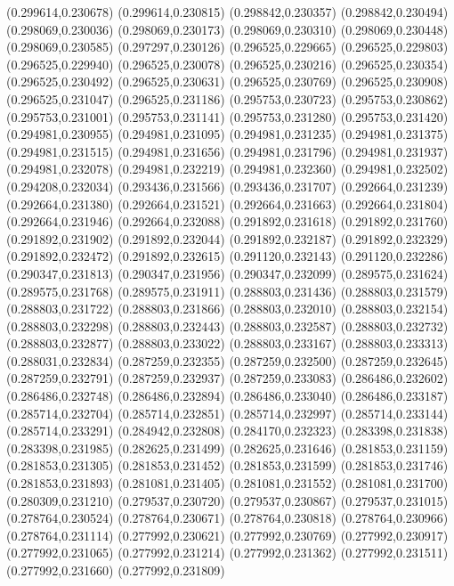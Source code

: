 (0.299614,0.230678)
(0.299614,0.230815)
(0.298842,0.230357)
(0.298842,0.230494)
(0.298069,0.230036)
(0.298069,0.230173)
(0.298069,0.230310)
(0.298069,0.230448)
(0.298069,0.230585)
(0.297297,0.230126)
(0.296525,0.229665)
(0.296525,0.229803)
(0.296525,0.229940)
(0.296525,0.230078)
(0.296525,0.230216)
(0.296525,0.230354)
(0.296525,0.230492)
(0.296525,0.230631)
(0.296525,0.230769)
(0.296525,0.230908)
(0.296525,0.231047)
(0.296525,0.231186)
(0.295753,0.230723)
(0.295753,0.230862)
(0.295753,0.231001)
(0.295753,0.231141)
(0.295753,0.231280)
(0.295753,0.231420)
(0.294981,0.230955)
(0.294981,0.231095)
(0.294981,0.231235)
(0.294981,0.231375)
(0.294981,0.231515)
(0.294981,0.231656)
(0.294981,0.231796)
(0.294981,0.231937)
(0.294981,0.232078)
(0.294981,0.232219)
(0.294981,0.232360)
(0.294981,0.232502)
(0.294208,0.232034)
(0.293436,0.231566)
(0.293436,0.231707)
(0.292664,0.231239)
(0.292664,0.231380)
(0.292664,0.231521)
(0.292664,0.231663)
(0.292664,0.231804)
(0.292664,0.231946)
(0.292664,0.232088)
(0.291892,0.231618)
(0.291892,0.231760)
(0.291892,0.231902)
(0.291892,0.232044)
(0.291892,0.232187)
(0.291892,0.232329)
(0.291892,0.232472)
(0.291892,0.232615)
(0.291120,0.232143)
(0.291120,0.232286)
(0.290347,0.231813)
(0.290347,0.231956)
(0.290347,0.232099)
(0.289575,0.231624)
(0.289575,0.231768)
(0.289575,0.231911)
(0.288803,0.231436)
(0.288803,0.231579)
(0.288803,0.231722)
(0.288803,0.231866)
(0.288803,0.232010)
(0.288803,0.232154)
(0.288803,0.232298)
(0.288803,0.232443)
(0.288803,0.232587)
(0.288803,0.232732)
(0.288803,0.232877)
(0.288803,0.233022)
(0.288803,0.233167)
(0.288803,0.233313)
(0.288031,0.232834)
(0.287259,0.232355)
(0.287259,0.232500)
(0.287259,0.232645)
(0.287259,0.232791)
(0.287259,0.232937)
(0.287259,0.233083)
(0.286486,0.232602)
(0.286486,0.232748)
(0.286486,0.232894)
(0.286486,0.233040)
(0.286486,0.233187)
(0.285714,0.232704)
(0.285714,0.232851)
(0.285714,0.232997)
(0.285714,0.233144)
(0.285714,0.233291)
(0.284942,0.232808)
(0.284170,0.232323)
(0.283398,0.231838)
(0.283398,0.231985)
(0.282625,0.231499)
(0.282625,0.231646)
(0.281853,0.231159)
(0.281853,0.231305)
(0.281853,0.231452)
(0.281853,0.231599)
(0.281853,0.231746)
(0.281853,0.231893)
(0.281081,0.231405)
(0.281081,0.231552)
(0.281081,0.231700)
(0.280309,0.231210)
(0.279537,0.230720)
(0.279537,0.230867)
(0.279537,0.231015)
(0.278764,0.230524)
(0.278764,0.230671)
(0.278764,0.230818)
(0.278764,0.230966)
(0.278764,0.231114)
(0.277992,0.230621)
(0.277992,0.230769)
(0.277992,0.230917)
(0.277992,0.231065)
(0.277992,0.231214)
(0.277992,0.231362)
(0.277992,0.231511)
(0.277992,0.231660)
(0.277992,0.231809)
